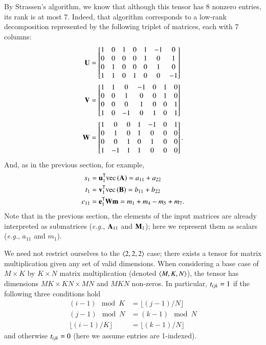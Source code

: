 \documentclass[preprint]{sigplanconf}
\newcommand{\Tra}{{\sf T}}
\newcommand{\V}[2][]{{\bm{#1\mathbf{\MakeLowercase{#2}}}}}
\newcommand{\VE}[3][]{#1{\MakeLowercase{#2}}_{#3}}
\newcommand{\M}[2][]{{\bm{#1\mathbf{\MakeUppercase{#2}}}}}
\newcommand{\MC}[3][]{\V[#1]{#2}_{#3}}
\newcommand{\ME}[3][]{#1{\MakeLowercase{#2}}_{#3}}
\newcommand{\TE}[3][]{#1{\MakeLowercase{#2}}_{#3}}
\begin{document}
By Strassen's algorithm, we know that although this tensor has 8 nonzero entries, its rank is at most 7.
Indeed, that algorithm corresponds to a low-rank decomposition represented by the following triplet of matrices, each with 7 columns:
\begin{align*}
\M{U} &= \begin{bmatrix}
1 & 0 & 1 & 0 & 1 & -1 & 0 \\
0 & 0 & 0 & 0 & 1 & 0 & 1 \\
0 & 1 & 0 & 0 & 0 & 1 & 0 \\
1 & 1 & 0 & 1 & 0 & 0 & -1
\end{bmatrix} \\
\M{V} &= \begin{bmatrix}
1 & 1 & 0 & -1 & 0 & 1 & 0 \\
0 & 0 & 1 & 0 & 0 & 1 & 0 \\
0 & 0 & 0 & 1 & 0 & 0 & 1 \\
1 & 0 & -1 & 0 & 1 & 0 & 1 \\
\end{bmatrix} \\
\M{W} &= \begin{bmatrix}
1 & 0 & 0 & 1 & -1 & 0 & 1 \\
0 & 1 & 0 & 1 & 0 & 0 & 0 \\
0 & 0 & 1 & 0 & 1 & 0 & 0 \\
1 & -1 & 1 & 1 & 0 & 0 & 0 \\
\end{bmatrix}.
\end{align*}
And, as in the previous section, for example,
\begin{align*}
\VE{S}{1} &= \MC{u}{1}^{\Tra}\vecmat{\M{A}} = \ME{A}{11} + \ME{A}{22} \\
\VE{T}{1} &=  \MC{v}{1}^{\Tra}\vecmat{\M{B}} = \ME{B}{11} + \ME{B}{22} \\
\ME{C}{11} &=  \MC{e}{1}^{\Tra}\M{W} \V{m} = \VE{M}{1} + \VE{M}{4} - \VE{M}{5} + \VE{M}{7}.
\end{align*}
Note that in the previous section, the elements of the input matrices are already interpreted as submatrices (\emph{e.g.}, $\M{A}_{11}$ and $\M{M}_1$); here we represent them as scalars (\emph{e.g.}, $a_{11}$ and $m_1$).



We need not restrict ourselves to the $\left\langle2, 2, 2\right\rangle$ case; there exists a tensor for matrix multiplication given any set of valid dimensions.
When considering a base case of $M \times K$ by $K \times N$ matrix multiplication (denoted $\left\langle M, K, N\right\rangle$),
the tensor has dimensions $MK \times KN \times MN$ and $MKN$ non-zeros.
In particular, $\TE{T}{ijk}=1$ if the following three conditions hold 
\begin{align*}
(i-1) \mod K &= \lfloor(j-1) / N \rfloor \\
(j-1) \mod N &= (k-1) \mod N \\
\lfloor (i-1) / K \rfloor &= \lfloor (k-1) / N \rfloor 
\end{align*}
and otherwise $\TE{T}{ijk}=0$ (here we assume entries are 1-indexed).
\end{document}

